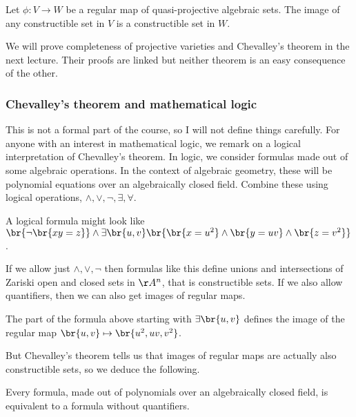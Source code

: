 \begin{theorem}
\label{thm:chevalleytheorem}
Let $ \phi : V \to W $ be a regular map of quasi-projective algebraic sets. The image of any constructible set in $ V $ is a constructible set in $ W $.
\end{theorem}

We will prove completeness of projective varieties and Chevalley's theorem in the next lecture. Their proofs are linked but neither theorem is an easy consequence of the other.

\subsubsection{Chevalley's theorem and mathematical logic}

This is not a formal part of the course, so I will not define things carefully. For anyone with an interest in mathematical logic, we remark on a logical interpretation of Chevalley's theorem. In logic, we consider formulas made out of some algebraic operations. In the context of algebraic geometry, these will be polynomial equations over an algebraically closed field. Combine these using logical operations, $ \land, \lor, \lnot, \exists, \forall $.

\begin{example*}
A logical formula might look like $ \br{\lnot\br{xy = z}} \land \exists\br{u, v}\br{\br{x = u^2} \land \br{y = uv} \land \br{z = v^2}} $.
\end{example*}

If we allow just $ \land, \lor, \lnot $ then formulas like this define unions and intersections of Zariski open and closed sets in $ \AA^n $, that is constructible sets. If we also allow quantifiers, then we can also get images of regular maps.

\begin{example*}
The part of the formula above starting with $ \exists\br{u, v} $ defines the image of the regular map $ \br{u, v} \mapsto \br{u^2, uv, v^2} $.
\end{example*}

But Chevalley's theorem tells us that images of regular maps are actually also constructible sets, so we deduce the following.

\begin{fact*}
Every formula, made out of polynomials over an algebraically closed field, is equivalent to a formula without quantifiers.
\end{fact*}

